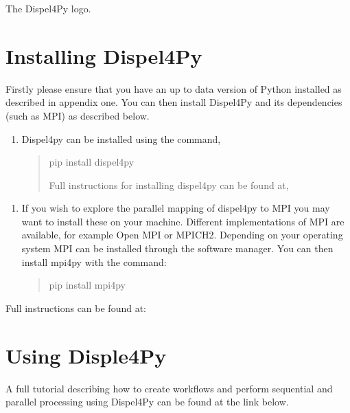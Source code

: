 \documentclass[english]{book}
\begin{document}

 The Dispel4Py logo.


\section{Installing Dispel4Py}
\label{\detokenize{Appendix4:a4-1-installing-dispel4py}}
Firstly please ensure that you have an up to data version of Python
installed as described in appendix one. You can then install Dispel4Py
and its dependencies (such as MPI) as described below.
\begin{enumerate}
\item {} 
 Dispel4py can be installed using the
command,
\begin{quote}

pip install dispel4py

Full instructions for installing dispel4py can be found at,
\begin{quote}

\end{quote}
\end{quote}

\end{enumerate}
\begin{enumerate}
\item {} 
 If you wish to explore the
parallel mapping of dispel4py to MPI you may want to install these on
your machine. Different implementations of MPI are available, for
example Open MPI or MPICH2. Depending on your operating system MPI
can be installed through the software manager. You can then install
mpi4py with the command:
\begin{quote}

pip install mpi4py
\end{quote}

\end{enumerate}

Full instructions can be found at:



\section{Using Disple4Py}
\label{\detokenize{Appendix4:a4-2-using-disple4py}}
A full tutorial describing how to create workflows and perform
sequential and parallel processing using Dispel4Py can be found at the
link below.
\end{document}
